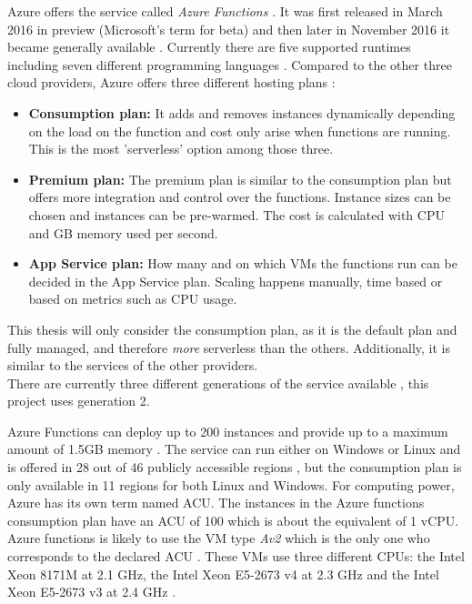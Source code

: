 Azure offers the service called \textit{Azure Functions} \cite{AzureFunctions}. It was first released in March 2016 in preview (Microsoft's term for beta) and then later in November 2016 it became generally available \cite{AzureFunctionsAnnouncement}. Currently there are five supported runtimes including seven different programming languages \cite{AzureFunctionsLanguages}.
Compared to the other three cloud providers, Azure offers three different hosting plans \cite{AzureFunctionsPlans}:
\begin{itemize}
\item[] \textbf{Consumption plan:} It adds and removes instances dynamically depending on the load on the function and cost only arise when functions are running. This is the most 'serverless' option among those three.
\item[] \textbf{Premium plan:} The premium plan is similar to the consumption plan but offers more integration and control over the functions. Instance sizes can be chosen and instances can be pre-warmed. The cost is calculated with \gls{CPU} and \gls{GB} memory used per second.
\item[] \textbf{App Service plan:} How many and on which \gls{VM}s the functions run can be decided in the App Service plan. Scaling happens manually, time based or based on metrics such as \gls{CPU} usage.
\end{itemize}
This thesis will only consider the consumption plan, as it is the default plan and fully managed, and therefore \textit{more} serverless than the others. Additionally, it is similar to the services of the other providers.\\
There are currently three different generations of the service available \cite{AzureFunctionsGenerations}, this project uses generation 2.

Azure Functions can deploy up to 200 instances and provide up to a maximum amount of 1.5GB memory \cite{AzureFunctionsPlans}. The service can run either on Windows or Linux and is offered in 28 out of 46 publicly accessible regions \cite{AzureRegions}, but the consumption plan is only available in 11 regions for both Linux and Windows. For computing power, Azure has its own term named \gls{ACU}. The instances in the Azure functions consumption plan have an \gls{ACU} of 100 which is about the equivalent of 1 \gls{vCPU}. Azure functions is likely to use the \gls{VM} type \textit{Av2} which is the only one who corresponds to the declared \gls{ACU} \cite{AzureFunctionsVMs}. These \gls{VM}s use three different \gls{CPU}s: the Intel Xeon 8171M at 2.1 \gls{GHz}, the Intel Xeon E5-2673 v4 at 2.3 \gls{GHz} and the Intel Xeon E5-2673 v3 at 2.4 \gls{GHz} \cite{AzureFunctionsVMs}.

